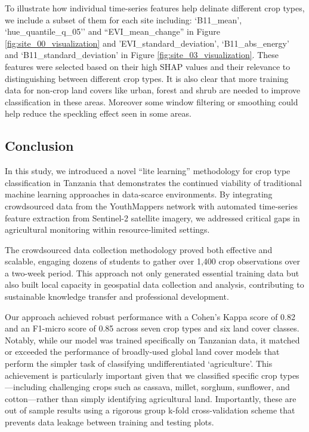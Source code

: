 \documentclass[
  journal,
  twocolumn]{IEEEtran}
\begin{document}
To illustrate how individual time-series features help delinate
different crop types, we include a subset of them for each site
including: `B11\_mean', `hue\_quantile\_q\_05'' and
``EVI\_mean\_change'' in Figure \ref{fig:site_00_visualization} and
'EVI\_standard\_deviation', `B11\_abs\_energy' and
`B11\_standard\_deviation' in Figure \ref{fig:site_03_visualization}.
These features were selected based on their high SHAP values and their
relevance to distinguishing between different crop types. It is also
clear that more training data for non-crop land covers like urban,
forest and shrub are needed to improve classification in these areas.
Moreover some window filtering or smoothing could help reduce the
speckling effect seen in some areas.

\subsection{Conclusion}\label{conclusion}

In this study, we introduced a novel ``lite learning'' methodology for
crop type classification in Tanzania that demonstrates the continued
viability of traditional machine learning approaches in data-scarce
environments. By integrating crowdsourced data from the YouthMappers
network with automated time-series feature extraction from Sentinel-2
satellite imagery, we addressed critical gaps in agricultural monitoring
within resource-limited settings.

The crowdsourced data collection methodology proved both effective and
scalable, engaging dozens of students to gather over 1,400 crop
observations over a two-week period. This approach not only generated
essential training data but also built local capacity in geospatial data
collection and analysis, contributing to sustainable knowledge transfer
and professional development.

Our approach achieved robust performance with a Cohen's Kappa score of
0.82 and an F1-micro score of 0.85 across seven crop types and six land
cover classes. Notably, while our model was trained specifically on
Tanzanian data, it matched or exceeded the performance of broadly-used
global land cover models that perform the simpler task of classifying
undifferentiated `agriculture'. This achievement is particularly
important given that we classified specific crop types---including
challenging crops such as cassava, millet, sorghum, sunflower, and
cotton---rather than simply identifying agricultural land. Importantly,
these are out of sample results using a rigorous group k-fold
cross-validation scheme that prevents data leakage between training and
testing plots.
\end{document}
